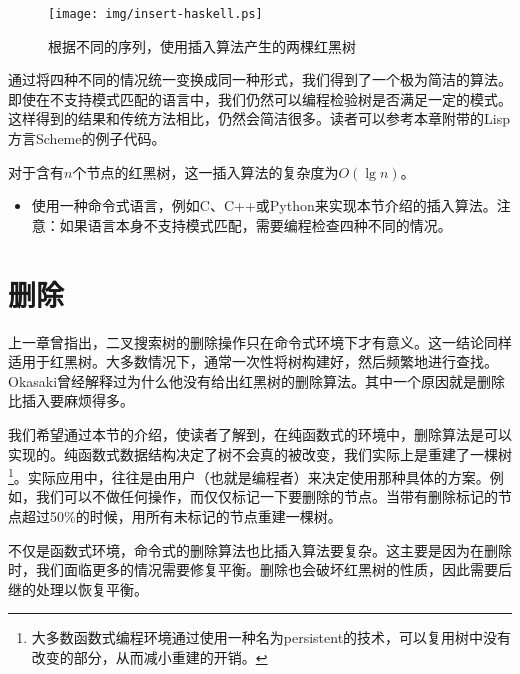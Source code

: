 \documentclass{ctexart}
\begin{document}
\begin{figure}[htbp]
  \centering
  \texttt{[image: img/insert-haskell.ps]}
  \caption{根据不同的序列，使用插入算法产生的两棵红黑树} \label{fig:insert-example}
\end{figure}

通过将四种不同的情况统一变换成同一种形式，我们得到了一个极为简洁的算法。即使在不支持模式匹配的语言中，我们仍然可以编程检验树是否满足一定的模式。这样得到的结果和传统方法相比，仍然会简洁很多。读者可以参考本章附带的Lisp方言Scheme的例子代码。

对于含有$n$个节点的红黑树，这一插入算法的复杂度为$O(\lg n)$。

\begin{Exercise}

\begin{itemize}
\item 使用一种命令式语言，例如C、C++或Python来实现本节介绍的插入算法。注意：如果语言本身不支持模式匹配，需要编程检查四种不同的情况。
\end{itemize}

\end{Exercise}


\section{删除}

上一章曾指出，二叉搜索树的删除操作只在命令式环境下才有意义。这一结论同样适用于红黑树。大多数情况下，通常一次性将树构建好，然后频繁地进行查找。Okasaki曾经解释过为什么他没有给出红黑树的删除算法\cite{okasaki-blog}。其中一个原因就是删除比插入要麻烦得多。

我们希望通过本节的介绍，使读者了解到，在纯函数式的环境中，删除算法是可以实现的。纯函数式数据结构决定了树不会真的被改变，我们实际上是重建了一棵树\footnote{大多数函数式编程环境通过使用一种名为persistent的技术，可以复用树中没有改变的部分，从而减小重建的开销。}。实际应用中，往往是由用户（也就是编程者）来决定使用那种具体的方案。例如，我们可以不做任何操作，而仅仅标记一下要删除的节点。当带有删除标记的节点超过50\%的时候，用所有未标记的节点重建一棵树。

不仅是函数式环境，命令式的删除算法也比插入算法要复杂。这主要是因为在删除时，我们面临更多的情况需要修复平衡。删除也会破坏红黑树的性质，因此需要后继的处理以恢复平衡。
\end{document}
